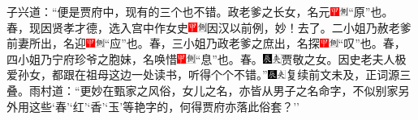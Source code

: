 {子兴道：``便是贾府中，现有的三个也不错。政老爹之长女，名元{\includegraphics[width=3mm]{../Images/00002}\includegraphics[width=3mm]{../Images/00011}\footnotesize \kaishu ``原''也。}春，现因贤孝才德，选入宫中作女史{\includegraphics[width=3mm]{../Images/00002}\includegraphics[width=3mm]{../Images/00011}\footnotesize \kaishu 因汉以前例，妙！}去了。二小姐乃赦老爹前妻所出，名迎{\includegraphics[width=3mm]{../Images/00002}\includegraphics[width=3mm]{../Images/00011}\footnotesize \kaishu ``应''也。}春，三小姐乃政老爹之庶出，名探{\includegraphics[width=3mm]{../Images/00002}\includegraphics[width=3mm]{../Images/00011}\footnotesize \kaishu ``叹''也。}春，四小姐乃宁府珍爷之胞妹，名唤惜{\includegraphics[width=3mm]{../Images/00002}\includegraphics[width=3mm]{../Images/00011}\footnotesize \kaishu ``息''也。}春。{\includegraphics[width=3mm]{../Images/00009}\includegraphics[width=3mm]{../Images/00012}\footnotesize \kaishu 贾敬之女。}因史老夫人极爱孙女，都跟在祖母这边一处读书，听得个个不错。''{\includegraphics[width=3mm]{../Images/00009}\includegraphics[width=3mm]{../Images/00012}\footnotesize \kaishu 复续前文未及，正词源三叠。}雨村道：``更妙在甄家之风俗，女儿之名，亦皆从男子之名命字，不似别家另外用这些`春'`红'`香'`玉'等艳字的，何得贾府亦落此俗套？''

}
